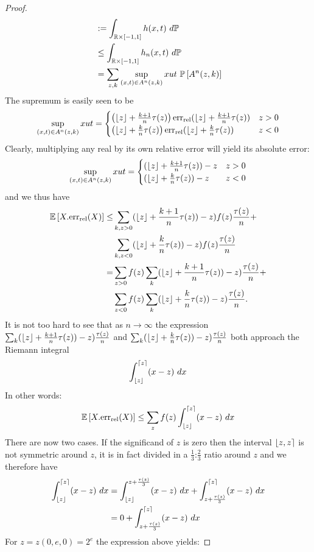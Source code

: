 \begin{proof}
\begin{align*}
& \mathrel{:=} \int_{\mathbb{R}\times [-1,1]} h(x,t)~d\mathbb{P}\\
&\leq \int_{\mathbb{R}\times [-1,1]} h_n(x,t)~d\mathbb{P}\\
&= \sum_{z,k} \sup_{(x,t)\in A^n(z,k)} xu t~ \mathbb{P}\left[ A^n(z,k) \right]
\end{align*}
The supremum is easily seen to be
\[
\sup_{(x,t)\in A^n(z,k)} xu t = 
\begin{cases}
\left(\lfloor z \rfloor+\frac{k+1}{n}\tau(z)\right)\mathrm{err}_{\mathrm{rel}}(\lfloor z \rfloor+\frac{k+1}{n}\tau(z)) & z > 0
\\
\left(\lfloor z \rfloor+\frac{k}{n}\tau(z)\right)\mathrm{err}_{\mathrm{rel}}(\lfloor z \rfloor+\frac{k}{n}\tau(z)) & z<0
\end{cases}
\]
Clearly, multiplying any real by its own relative error will yield its absolute error:
\[
\sup_{(x,t)\in A^n(z,k)} xu t = 
\begin{cases}
(\lfloor z \rfloor+\frac{k+1}{n}\tau(z))-z & z > 0\\
(\lfloor z \rfloor+\frac{k}{n}\tau(z))-z & z<0
\end{cases}
\]
and we thus have
\begin{align*}
\mathbb{E}\left[X.\mathrm{err}_{\mathrm{rel}}(X)\right]\leq & \sum_{k,z>0} (\lfloor z \rfloor+\frac{k+1}{n}\tau(z))-z) f(z) \frac{\tau(z)}{n} + \\
&\sum_{k,z<0} (\lfloor z \rfloor+\frac{k}{n}\tau(z))-z) f(z) \frac{\tau(z)}{n}\\
 = &\sum_{z>0} f(z) \sum_k (\lfloor z \rfloor+\frac{k+1}{n}\tau(z))-z)\frac{\tau(z)}{n}+\\
&\sum_{z<0} f(z) \sum_k (\lfloor z \rfloor+\frac{k}{n}\tau(z))-z)\frac{\tau(z)}{n}.
\end{align*}
It is not too hard to see that as $n\to\infty$ the expression $\sum_k (\lfloor z \rfloor+\frac{k+1}{n}\tau(z))-z)\frac{\tau(z)}{n}$ and $\sum_k (\lfloor z \rfloor+\frac{k}{n}\tau(z))-z)\frac{\tau(z)}{n}$ both approach the Riemann integral
\[
\int_{\lfloor z \rfloor}^{\lceil z \rceil} (x-z)~dx
\] 
In other words:
\[
\mathbb{E}\left[X.\mathrm{err}_{\mathrm{rel}}(X)\right]\leq \sum_z f(z) \int_{\lfloor z \rfloor}^{\lceil z \rceil} (x-z)~dx
\]
There are now two cases. If the significand of $z$ is zero then the interval $\fintvl$ is not symmetric around $z$, it is in fact divided in a $\frac{1}{3}$:$\frac{2}{3}$ ratio around $z$ and we therefore have
\begin{align*}
\int_{\lfloor z \rfloor}^{\lceil z \rceil} (x-z)~dx &= \int_{\lfloor z \rfloor}^{z+\frac{\tau(z)}{3}} (x-z)~dx+ \int_{z+\frac{\tau(z)}{3}}^{\lceil z \rceil} (x-z)~dx\\
&=0+\int_{z+\frac{\tau(z)}{3}}^{\lceil z \rceil} (x-z)~dx\\
\end{align*} 
For $z=z(0,e,0)=2^e$ the expression above yields:

\end{proof}
